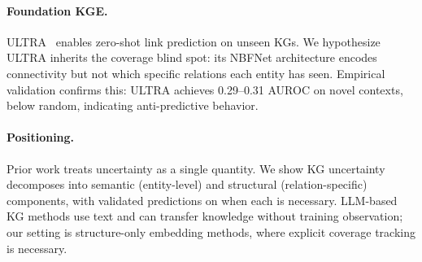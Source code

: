 \paragraph{Foundation KGE.}
ULTRA~\citep{galkin2024ultra} enables zero-shot link prediction on unseen KGs.
We hypothesize ULTRA inherits the coverage blind spot: its NBFNet architecture encodes connectivity but not which specific relations each entity has seen.
Empirical validation confirms this: ULTRA achieves 0.29--0.31 AUROC on novel contexts, below random, indicating anti-predictive behavior.

\paragraph{Positioning.}
Prior work treats uncertainty as a single quantity. We show KG uncertainty decomposes into semantic (entity-level) and structural (relation-specific) components, with validated predictions on when each is necessary. LLM-based KG methods use text and can transfer knowledge without training observation; our setting is structure-only embedding methods, where explicit coverage tracking is necessary.
